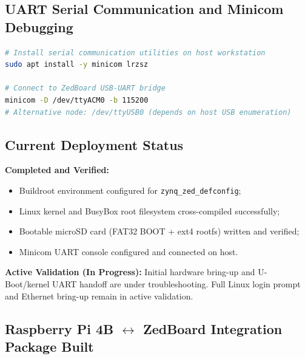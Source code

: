 \documentclass[12pt,a4paper]{article}
\begin{document}
\subsection{UART Serial Communication and Minicom Debugging}

\begin{lstlisting}[language=bash, caption={UART terminal setup for ZedBoard boot monitoring}]
# Install serial communication utilities on host workstation
sudo apt install -y minicom lrzsz

# Connect to ZedBoard USB-UART bridge
minicom -D /dev/ttyACM0 -b 115200
# Alternative node: /dev/ttyUSB0 (depends on host USB enumeration)
\end{lstlisting}

\subsection{Current Deployment Status}

\begin{reqbox}
\textbf{Completed and Verified:}
\begin{itemize}
  \item Buildroot environment configured for \texttt{zynq\_zed\_defconfig};
  \item Linux kernel and BusyBox root filesystem cross-compiled successfully;
  \item Bootable microSD card (FAT32 BOOT + ext4 rootfs) written and verified;
  \item Minicom UART console configured and connected on host.
\end{itemize}
\textbf{Active Validation (In Progress):}
Initial hardware bring-up and U-Boot/kernel UART handoff are under troubleshooting.
Full Linux login prompt and Ethernet bring-up remain in active validation.
\end{reqbox}

\subsection{Raspberry Pi 4B $\leftrightarrow$ ZedBoard Integration Package Built}
\end{document}
